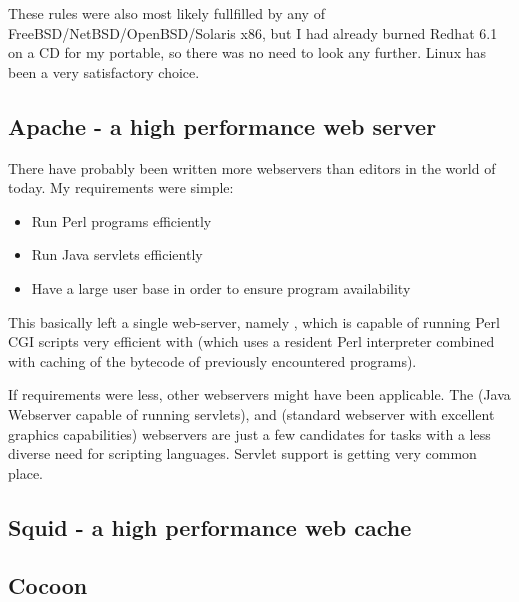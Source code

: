 These rules were also most likely fullfilled by any of
FreeBSD/NetBSD/OpenBSD/Solaris x86, but I had already burned Redhat
6.1 on a CD for my portable, so there was no need to look any
further.  Linux has been a very satisfactory choice.

\subsection{Apache - a high performance web server}
\label{sec:apache}

There have probably been written more webservers than editors in the
world of today.  My requirements were simple:

\begin{itemize}
\item Run Perl programs efficiently
\item Run Java servlets efficiently
\item Have a large user base in order to ensure program availability
\end{itemize}

This basically left a single web-server, namely
, which is capable of running
Perl CGI scripts very efficient with
 (which
uses a resident Perl interpreter combined with caching of the bytecode
of previously encountered programs).

If requirements were less, other webservers might have been
applicable.  The
 (Java
Webserver capable of running servlets),
and  (standard webserver with
excellent graphics capabilities) webservers are just a few candidates for
tasks with a less diverse need for scripting languages.  Servlet
support is getting very common place.


\subsection{Squid - a high performance web cache}
\label{sec:squid}



\subsection{Cocoon}
\label{sec:cocoon}



